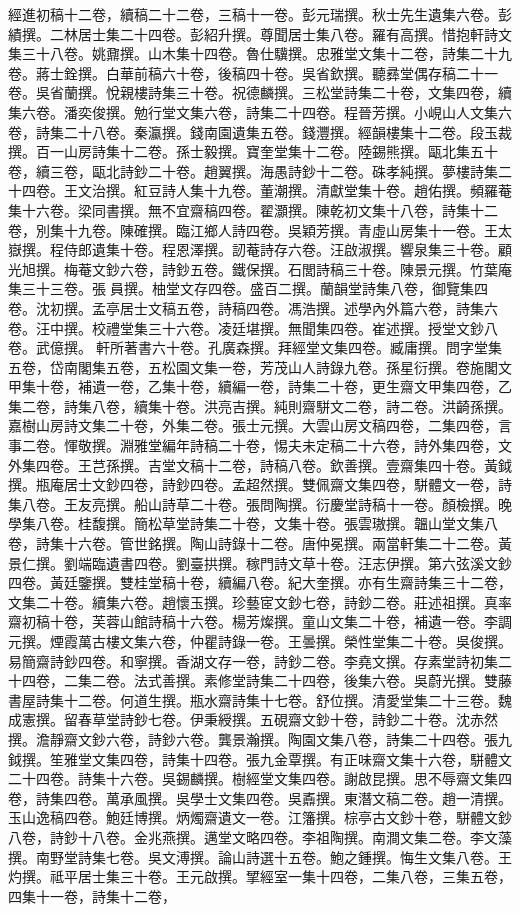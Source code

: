 \begin{pinyinscope}
經進初稿十二卷，續稿二十二卷，三稿十一卷。彭元瑞撰。秋士先生遺集六卷。彭績撰。二林居士集二十四卷。彭紹升撰。尊聞居士集八卷。羅有高撰。惜抱軒詩文集三十八卷。姚鼐撰。山木集十四卷。魯仕驥撰。忠雅堂文集十二卷，詩集二十九卷。蔣士銓撰。白華前稿六十卷，後稿四十卷。吳省欽撰。聽彞堂偶存稿二十一卷。吳省蘭撰。悅親樓詩集三十卷。祝德麟撰。三松堂詩集二十卷，文集四卷，續集六卷。潘奕俊撰。勉行堂文集六卷，詩集二十四卷。程晉芳撰。小峴山人文集六卷，詩集二十八卷。秦瀛撰。錢南園遺集五卷。錢灃撰。經韻樓集十二卷。段玉裁撰。百一山房詩集十二卷。孫士毅撰。寶奎堂集十二卷。陸錫熊撰。甌北集五十卷，續三卷，甌北詩鈔二十卷。趙翼撰。海愚詩鈔十二卷。硃孝純撰。夢樓詩集二十四卷。王文治撰。紅豆詩人集十九卷。董潮撰。清獻堂集十卷。趙佑撰。頻羅菴集十六卷。梁同書撰。無不宜齋稿四卷。翟灝撰。陳乾初文集十八卷，詩集十二卷，別集十九卷。陳確撰。臨江鄉人詩四卷。吳穎芳撰。青虛山房集十一卷。王太嶽撰。程侍郎遺集十卷。程恩澤撰。訒菴詩存六卷。汪啟淑撰。響泉集三十卷。顧光旭撰。梅菴文鈔六卷，詩鈔五卷。鐵保撰。石閭詩稿三十卷。陳景元撰。竹葉庵集三十三卷。張員撰。柚堂文存四卷。盛百二撰。蘭韻堂詩集八卷，御覽集四卷。沈初撰。孟亭居士文稿五卷，詩稿四卷。馮浩撰。述學內外篇六卷，詩集六卷。汪中撰。校禮堂集三十六卷。凌廷堪撰。無聞集四卷。崔述撰。授堂文鈔八卷。武億撰。軒所著書六十卷。孔廣森撰。拜經堂文集四卷。臧庸撰。問字堂集五卷，岱南閣集五卷，五松園文集一卷，芳茂山人詩錄九卷。孫星衍撰。卷施閣文甲集十卷，補遺一卷，乙集十卷，續編一卷，詩集二十卷，更生齋文甲集四卷，乙集二卷，詩集八卷，續集十卷。洪亮吉撰。純則齋駢文二卷，詩二卷。洪齮孫撰。嘉樹山房詩文集二十卷，外集二卷。張士元撰。大雲山房文稿四卷，二集四卷，言事二卷。惲敬撰。淵雅堂編年詩稿二十卷，惕夫未定稿二十六卷，詩外集四卷，文外集四卷。王芑孫撰。吉堂文稿十二卷，詩稿八卷。欽善撰。壹齋集四十卷。黃鉞撰。瓶庵居士文鈔四卷，詩鈔四卷。孟超然撰。雙佩齋文集四卷，駢體文一卷，詩集八卷。王友亮撰。船山詩草二十卷。張問陶撰。衍慶堂詩稿十一卷。顏檢撰。晚學集八卷。桂馥撰。簡松草堂詩集二十卷，文集十卷。張雲璈撰。韞山堂文集八卷，詩集十六卷。管世銘撰。陶山詩錄十二卷。唐仲冕撰。兩當軒集二十二卷。黃景仁撰。劉端臨遺書四卷。劉臺拱撰。稼門詩文草十卷。汪志伊撰。第六弦溪文鈔四卷。黃廷鑒撰。雙桂堂稿十卷，續編八卷。紀大奎撰。亦有生齋詩集三十二卷，文集二十卷。續集六卷。趙懷玉撰。珍藝宧文鈔七卷，詩鈔二卷。莊述祖撰。真率齋初稿十卷，芙蓉山館詩稿十六卷。楊芳燦撰。童山文集二十卷，補遺一卷。李調元撰。煙霞萬古樓文集六卷，仲瞿詩錄一卷。王曇撰。榮性堂集二十卷。吳俊撰。易簡齋詩鈔四卷。和寧撰。香湖文存一卷，詩鈔二卷。李堯文撰。存素堂詩初集二十四卷，二集二卷。法式善撰。素修堂詩集二十四卷，後集六卷。吳蔚光撰。雙藤書屋詩集十二卷。何道生撰。瓶水齋詩集十七卷。舒位撰。清愛堂集二十三卷。魏成憲撰。留春草堂詩鈔七卷。伊秉綬撰。五硯齋文鈔十卷，詩鈔二十卷。沈赤然撰。澹靜齋文鈔六卷，詩鈔六卷。龔景瀚撰。陶園文集八卷，詩集二十四卷。張九鉞撰。笙雅堂文集四卷，詩集十四卷。張九金覃撰。有正味齋文集十六卷，駢體文二十四卷。詩集十六卷。吳錫麟撰。樹經堂文集四卷。謝啟昆撰。思不辱齋文集四卷，詩集四卷。萬承風撰。吳學士文集四卷。吳鼒撰。東潛文稿二卷。趙一清撰。玉山逸稿四卷。鮑廷博撰。炳燭齋遺文一卷。江籓撰。棕亭古文鈔十卷，駢體文鈔八卷，詩鈔十八卷。金兆燕撰。邁堂文略四卷。李祖陶撰。南澗文集二卷。李文藻撰。南野堂詩集七卷。吳文溥撰。論山詩選十五卷。鮑之鍾撰。悔生文集八卷。王灼撰。祗平居士集三十卷。王元啟撰。揅經室一集十四卷，二集八卷，三集五卷，四集十一卷，詩集十二卷，
\end{pinyinscope}
